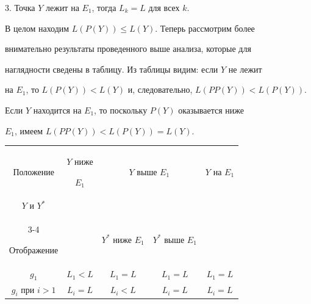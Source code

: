 \begin{pf}
3. Точка $Y$ лежит на $E_1$, тогда $L_k=L$ для всех $k$.





В целом находим $L(P(Y))\leqslant L(Y)$. Теперь рассмотрим более 


внимательно результаты проведенного выше анализа, которые для 


наглядности сведены в таблицу. Из таблицы видим: если $Y$ не лежит 


на $E_1$, то $L(P(Y))<L(Y)$ и, следовательно, $L(PP(Y))<L(P(Y))$. 


Если $Y$ находится на $E_1$, то поскольку $P(Y)$ оказывается ниже 


$E_1$, имеем $L(PP(Y))<L(P(Y))=L(Y)$.


\end{pf}


\medskip





\begin{center}


\begin{tabular}{|c|c|c|c|c|}


\hline


Положение & $Y$ ниже


$E_1$ & \multicolumn{2}{c|}{$Y$ выше $E_1$} & $Y$ на $E_1$\\


$Y$ и $Y^*$ & & \multicolumn{2}{c|}{\quad } & \\


\cline{3-4}


Отображение  &  & $Y^*$ ниже $E_1$ & $Y^*$ выше $E_1$ & \\


\hline


$g_1$ & $L_1<L$ & $L_1=L$ & $L_1=L$ & $L_1=L$\\


\hline


$g_i$ при $i>1$ & $L_i=L$ & $L_i<L$ & $L_i=L$ & $L_i=L$\\


\hline


\end{tabular}


\end{center}







\medskip





